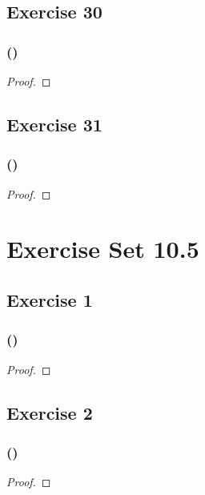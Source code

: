 \documentclass[14pt]{extarticle}
\begin{document}
\subsection{Exercise 30}

\subsubsection{()}

\begin{proof}

\end{proof}

\subsection{Exercise 31}

\subsubsection{()}

\begin{proof}

\end{proof}

\section{Exercise Set 10.5}
\subsection{Exercise 1}

\subsubsection{()}

\begin{proof}

\end{proof}

\subsection{Exercise 2}

\subsubsection{()}

\begin{proof}

\end{proof}
\end{document}

